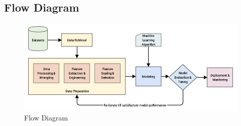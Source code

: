 \documentclass[12pt,a4paper]{article}
\begin{document}
\subsection{Flow Diagram}
\begin{figure}[h]
    \centering
    \includegraphics[width=6.5in]{flowdiag.png}
    \caption{Flow Diagram}
    \label{fig:flowdiag}
\end{figure}
\end{document}
